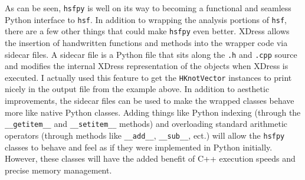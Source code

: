  As can be seen, \texttt{hsfpy} is well on its way to becoming a functional and seamless Python interface to \texttt{hsf}. In addition to wrapping the analysis portions of \texttt{hsf}, there are a few other things that could make \texttt{hsfpy} even better.  XDress allows the insertion of handwritten functions and methods into the wrapper code via sidecar files. A sidecar file is a Python file that sits along the \texttt{.h} and \texttt{.cpp} source and modifies the internal XDress representation of the objects when XDress is executed. I actually used this feature to get the \texttt{HKnotVector} instances to print nicely in the output file from the example above. In addition to aesthetic improvements, the sidecar files can be used to make the wrapped classes behave more like native Python classes. Adding things like Python indexing (through the \texttt{\_\_getitem\_\_} and \texttt{\_\_setitem\_\_} methods) and overloading standard arithmetic operators (through methods like \texttt{\_\_add\_\_}, \texttt{\_\_sub\_\_}, ect.) will allow the \texttt{hsfpy} classes to behave and feel as if they were implemented in Python initially. However, these classes will have the added benefit of C++ execution speeds and precise memory management.


